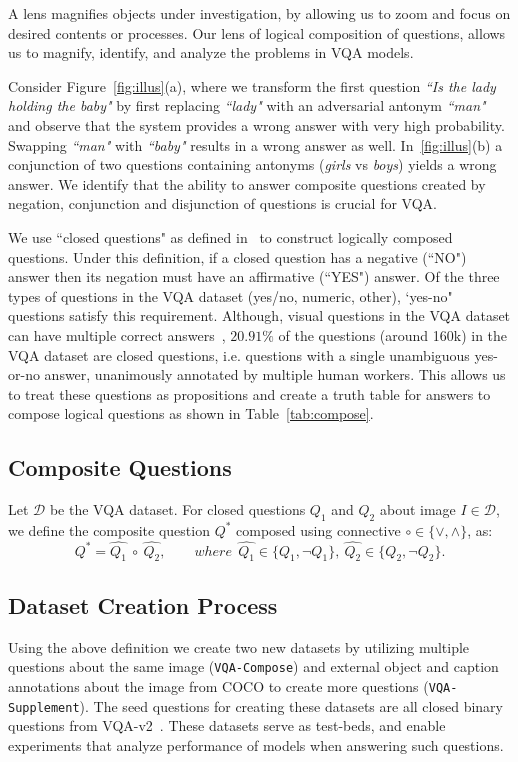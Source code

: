 A lens magnifies objects under investigation, by allowing us to zoom and focus on desired contents or processes.
Our lens of logical composition of questions, allows us to magnify, identify, and analyze the problems in VQA models.

Consider Figure~\ref{fig:illus}(a), where we transform the first question {\it ``Is the lady holding the baby"} by first replacing {\it ``lady"} with an adversarial antonym {\it ``man"} and observe that the system provides a wrong answer with very high probability.
Swapping {\it ``man"} with {\it ``baby"} results in a wrong answer as well.
In~\ref{fig:illus}(b) a conjunction of two questions containing antonyms ({\it girls} vs {\it boys}) yields a wrong answer.
We identify that the ability to answer composite questions created by negation, conjunction and disjunction of questions is crucial for VQA.

We use ``closed questions" as defined in~\citep{bobrow1964natural} to construct logically composed questions. 
Under this definition, if a closed question has a negative (``NO") answer then its negation must have an affirmative (``YES") answer.
Of the three types of questions in the VQA dataset (yes/no, numeric, other), `yes-no" questions satisfy this requirement.
Although, visual questions in the VQA dataset can have multiple correct answers~\citep{bhattacharya2019does}, $20.91\%$ of the questions (around 160k) in the VQA dataset are closed questions, i.e. questions with a single unambiguous yes-or-no answer, unanimously annotated by multiple human workers.
This allows us to treat these questions as propositions and create a truth table for answers to compose logical questions as shown in Table~\ref{tab:compose}.

    \subsection{Composite Questions}
    Let $\mathcal{D}$ be the VQA dataset. 
    For closed questions $Q_1$ and $Q_2$ about image $I\in\mathcal{D}$, we define the composite question $Q^*$ composed using connective $\circ\in\{ \vee, \wedge\}$, as:
    \begin{equation}
        Q^* = \widehat{Q_1} ~\circ ~\widehat{Q_2}, \qquad where~~ \widehat{Q_1} \in \{ Q_1, \neg Q_1\},  ~ \widehat{Q_2} \in \{ Q_2, \neg Q_2\}. 
    \end{equation}
    
    \subsection{Dataset Creation Process}
    Using the above definition we create two new datasets by utilizing multiple questions about the same image (\texttt{VQA-Compose}) and external object and caption annotations about the image from COCO to create more questions (\texttt{VQA-Supplement}).
    The seed questions for creating these datasets are all closed binary questions from VQA-v2~\citep{goyal2017making}.
    These datasets serve as test-beds, and enable experiments that analyze performance of models when answering such questions.\\

